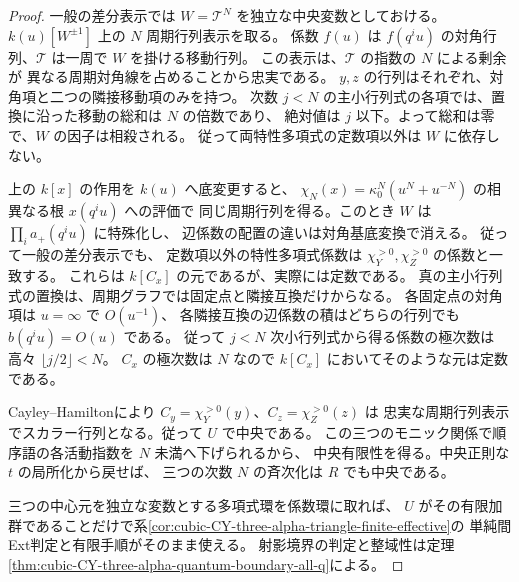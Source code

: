 \begin{proof}
一般の差分表示では $W=\mathcal T^N$ を独立な中央変数としておける。
$k(u)[W^{\pm1}]$ 上の $N$ 周期行列表示を取る。
係数 $f(u)$ は $f(q^i u)$ の対角行列、$\mathcal T$ は一周で $W$ を掛ける移動行列。
この表示は、$\mathcal T$ の指数の $N$ による剰余が
異なる周期対角線を占めることから忠実である。
$y,z$ の行列はそれぞれ、対角項と二つの隣接移動項のみを持つ。
次数 $j<N$ の主小行列式の各項では、置換に沿った移動の総和は $N$ の倍数であり、
絶対値は $j$ 以下。よって総和は零で、$W$ の因子は相殺される。
従って両特性多項式の定数項以外は $W$ に依存しない。

上の $k[x]$ の作用を $k(u)$ へ底変更すると、
$\chi_N(x)=\kappa_0^N(u^N+u^{-N})$ の相異なる根 $x(q^i u)$ への評価で
同じ周期行列を得る。このとき $W$ は $\prod_i a_+(q^i u)$ に特殊化し、
辺係数の配置の違いは対角基底変換で消える。
従って一般の差分表示でも、
定数項以外の特性多項式係数は $\chi_Y^{>0},\chi_Z^{>0}$ の係数と一致する。
これらは $k[C_x]$ の元であるが、実際には定数である。
真の主小行列式の置換は、周期グラフでは固定点と隣接互換だけからなる。
各固定点の対角項は $u=\infty$ で $O(u^{-1})$、
各隣接互換の辺係数の積はどちらの行列でも $b(q^i u)=O(u)$ である。
従って $j<N$ 次小行列式から得る係数の極次数は高々 $\lfloor j/2\rfloor<N$。
$C_x$ の極次数は $N$ なので $k[C_x]$ においてそのような元は定数である。

Cayley--Hamiltonにより
$C_y=\chi_Y^{>0}(y)$、$C_z=\chi_Z^{>0}(z)$ は
忠実な周期行列表示でスカラー行列となる。従って $U$ で中央である。
この三つのモニック関係で順序語の各活動指数を $N$ 未満へ下げられるから、
中央有限性を得る。中央正則な $t$ の局所化から戻せば、
三つの次数 $N$ の斉次化は $R$ でも中央である。

三つの中心元を独立な変数とする多項式環を係数環に取れば、
$U$ がその有限加群であることだけで系\ref{cor:cubic-CY-three-alpha-triangle-finite-effective}の
単純間Ext判定と有限手順がそのまま使える。
射影境界の判定と整域性は定理\ref{thm:cubic-CY-three-alpha-quantum-boundary-all-q}による。
\end{proof}


